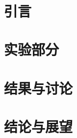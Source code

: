 \documentclass[a4paper,twocolumn,12pt]{article}
\begin{document}
\begin{titlepage}
  
\end{titlepage}

\title{\textbf{}}
\author{}
\date{}

\twocolumn[
\begin{@twocolumnfalse}
  \maketitle

  \begin{abstract}
    \\
  \end{abstract}
\end{@twocolumnfalse}]

\section{引言}
\label{sec:intro}



\section{实验部分}
\label{sec:methods}


\section{结果与讨论}
\label{sec:analysis}


\section{结论与展望}
\label{conclusion}

\end{document}
